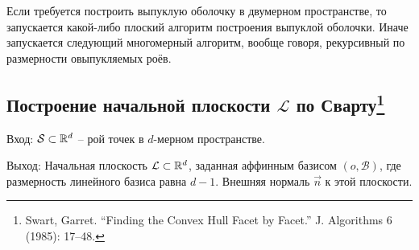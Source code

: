 \documentclass[a4paper,12pt]{article}
\newcommand{\R}[1][]{%
  \ifthenelse{\equal{#1}{}}%
  {\mathbb{R}}%
  {\mathbb{R}^{#1}}}
\newcommand{\Swarm}{\mathcal{S}}              %
\newcommand{\Basis}{\mathcal{B}}              %
\newcommand{\Plane}{\mathcal{L}}           %
\renewcommand{\.}{\hspace{0.2ex}}
\begin{document}
  Если требуется построить выпуклую оболочку в двумерном пространстве, то запускается какой-либо плоский алгоритм построения выпуклой оболочки. Иначе запускается следующий многомерный алгоритм, вообще говоря, рекурсивный по размерности овыпукляемых роёв.

  \subsection{Построение начальной плоскости $\Plane$ по Сварту\footnote{Swart, Garret. “Finding the Convex Hull Facet by Facet.” J. Algorithms 6 (1985): 17--48.}}
  \label{subsec:InitialPlaneSwart}

    Вход: $\Swarm \subset \R[d]$ -- рой точек в $d$-мерном пространстве.

    Выход: Начальная плоскость $\Plane \subset \R[d]$, заданная аффинным базисом $(o,\Basis)$, где размерность линейного базиса равна $d-1$. Внешняя нормаль $\vec n$ к этой плоскости.
\end{document}
